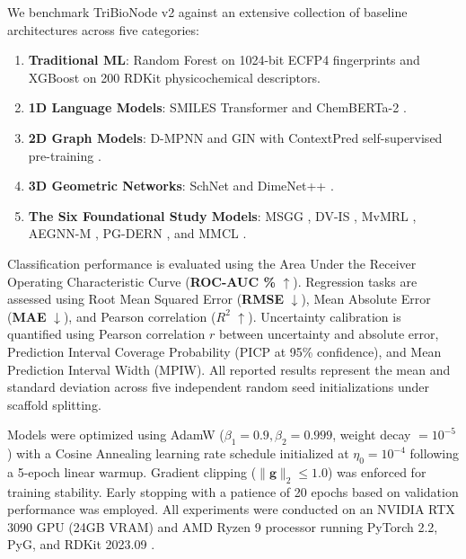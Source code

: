 \documentclass[10pt,twocolumn]{article}
\begin{document}
We benchmark TriBioNode v2 against an extensive collection of baseline architectures across five categories:
\begin{enumerate}
    \item \textbf{Traditional ML}: Random Forest on 1024-bit ECFP4 fingerprints and XGBoost on 200 RDKit physicochemical descriptors.
    \item \textbf{1D Language Models}: SMILES Transformer \cite{honda2019smiles} and ChemBERTa-2 \cite{chithrananda2020chemberta}.
    \item \textbf{2D Graph Models}: D-MPNN \cite{yang2019analyzing} and GIN with ContextPred self-supervised pre-training \cite{hu2020strategies}.
    \item \textbf{3D Geometric Networks}: SchNet \cite{schutt2018schnet} and DimeNet++ \cite{gasteiger2020directional}.
    \item \textbf{The Six Foundational Study Models}: MSGG \cite{wang2020molecular}, DV-IS \cite{zhang2024dual}, MvMRL \cite{zhang2024mvmrl}, AEGNN-M \cite{cai2025aegnn}, PG-DERN \cite{zhang2025property}, and MMCL \cite{gao2026mmcl}.
\end{enumerate}

Classification performance is evaluated using the Area Under the Receiver Operating Characteristic Curve (\textbf{ROC-AUC \%} $\uparrow$). Regression tasks are assessed using Root Mean Squared Error (\textbf{RMSE} $\downarrow$), Mean Absolute Error (\textbf{MAE} $\downarrow$), and Pearson correlation ($R^2$ $\uparrow$). Uncertainty calibration is quantified using Pearson correlation $r$ between uncertainty and absolute error, Prediction Interval Coverage Probability (PICP at 95\% confidence), and Mean Prediction Interval Width (MPIW). All reported results represent the mean and standard deviation across five independent random seed initializations under scaffold splitting.

Models were optimized using AdamW ($\beta_1 = 0.9, \beta_2 = 0.999$, weight decay $= 10^{-5}$) with a Cosine Annealing learning rate schedule initialized at $\eta_0 = 10^{-4}$ following a 5-epoch linear warmup. Gradient clipping ($\|\mathbf{g}\|_2 \le 1.0$) was enforced for training stability. Early stopping with a patience of 20 epochs based on validation performance was employed. All experiments were conducted on an NVIDIA RTX 3090 GPU (24GB VRAM) and AMD Ryzen 9 processor running PyTorch 2.2, PyG, and RDKit 2023.09 \cite{landrum2006rdkit}.

\FloatBarrier
\end{document}
